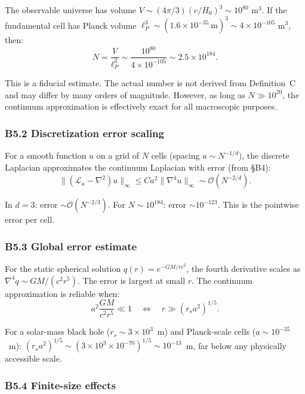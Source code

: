 \documentclass[reprint]{revtex4-2}
\begin{document}
The observable universe has volume $V \sim (4\pi/3)(c/H_0)^3 \sim 10^{80}$ m$^3$. If the fundamental cell has Planck volume $\ell_P^3 \sim (1.6\times 10^{-35}~\text{m})^3 \sim 4\times 10^{-105}$ m$^3$, then:
\begin{equation}
\boxed{N = \frac{V}{\ell_P^3} \sim \frac{10^{80}}{4\times 10^{-105}} \sim 2.5\times 10^{184}}.
\label{eq:N_estimate}
\end{equation}

This is a fiducial estimate. The actual number is not derived from Definition~C and may differ by many orders of magnitude. However, as long as $N \gg 10^{20}$, the continuum approximation is effectively exact for all macroscopic purposes.

\subsubsection{B5.2 Discretization error scaling}

For a smooth function $u$ on a grid of $N$ cells (spacing $a \sim N^{-1/d}$), the discrete Laplacian approximates the continuum Laplacian with error (from \S B4):
\begin{equation}
\|(\mathcal{L}_a - \nabla^2)u\|_\infty \le C a^2 \|\nabla^4 u\|_\infty \sim \mathcal{O}(N^{-2/d}).
\end{equation}

In $d=3$: error $\sim \mathcal{O}(N^{-2/3})$. For $N\sim 10^{184}$: error $\sim 10^{-123}$. This is the pointwise error per cell.

\subsubsection{B5.3 Global error estimate}

For the static spherical solution $q(r) = e^{-GM/rc^2}$, the fourth derivative scales as $\nabla^4 q \sim GM/(c^2 r^5)$. The error is largest at small $r$. The continuum approximation is reliable when:
\begin{equation}
a^2 \frac{GM}{c^2 r^5} \ll 1 \quad\Longleftrightarrow\quad r \gg (r_s a^2)^{1/5}.
\end{equation}

For a solar-mass black hole ($r_s \sim 3\times 10^3$~m) and Planck-scale cells ($a \sim 10^{-35}$~m): $(r_s a^2)^{1/5} \sim (3\times 10^3 \times 10^{-70})^{1/5} \sim 10^{-13}$~m, far below any physically accessible scale.

\subsubsection{B5.4 Finite-size effects}
\end{document}

